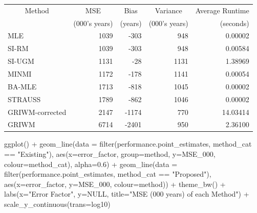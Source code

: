 \documentclass[
]{article}
\newenvironment{Shaded}{\begin{snugshade}}{\end{snugshade}}
\newcommand{\AttributeTok}[1]{\textcolor[rgb]{0.77,0.63,0.00}{#1}}
\newcommand{\ConstantTok}[1]{\textcolor[rgb]{0.00,0.00,0.00}{#1}}
\newcommand{\FloatTok}[1]{\textcolor[rgb]{0.00,0.00,0.81}{#1}}
\newcommand{\FunctionTok}[1]{\textcolor[rgb]{0.00,0.00,0.00}{#1}}
\newcommand{\NormalTok}[1]{#1}
\newcommand{\SpecialCharTok}[1]{\textcolor[rgb]{0.00,0.00,0.00}{#1}}
\newcommand{\StringTok}[1]{\textcolor[rgb]{0.31,0.60,0.02}{#1}}
\begin{document}
\begin{tabular}{lrrrr}
\toprule
\multicolumn{1}{c}{Method} & \multicolumn{1}{c}{MSE} & \multicolumn{1}{c}{Bias} & \multicolumn{1}{c}{Variance} & \multicolumn{1}{c}{Average Runtime} \\
\cmidrule(l{3pt}r{3pt}){1-1} \cmidrule(l{3pt}r{3pt}){2-2} \cmidrule(l{3pt}r{3pt}){3-3} \cmidrule(l{3pt}r{3pt}){4-4} \cmidrule(l{3pt}r{3pt}){5-5}
 & (000's years) & (years) & (000's years) & (seconds)\\
\midrule
MLE & 1039 & -303 & 948 & 0.00002\\
SI-RM & 1039 & -303 & 948 & 0.00584\\
SI-UGM & 1131 & -28 & 1131 & 1.38969\\
MINMI & 1172 & -178 & 1141 & 0.00054\\
BA-MLE & 1713 & -818 & 1045 & 0.00002\\
\addlinespace
STRAUSS & 1789 & -862 & 1046 & 0.00002\\
GRIWM-corrected & 2147 & -1174 & 770 & 14.03414\\
GRIWM & 6714 & -2401 & 950 & 2.36100\\
\bottomrule
\end{tabular}

\begin{Shaded}
\begin{Highlighting}[]
\FunctionTok{ggplot}\NormalTok{() }\SpecialCharTok{+}
  \FunctionTok{geom\_line}\NormalTok{(}\AttributeTok{data =} \FunctionTok{filter}\NormalTok{(performance.point\_estimates, method\_cat }\SpecialCharTok{==} \StringTok{"Existing"}\NormalTok{),}
            \FunctionTok{aes}\NormalTok{(}\AttributeTok{x=}\NormalTok{error\_factor, }\AttributeTok{group=}\NormalTok{method, }\AttributeTok{y=}\NormalTok{MSE\_000, }\AttributeTok{colour=}\NormalTok{method\_cat), }\AttributeTok{alpha=}\FloatTok{0.6}\NormalTok{) }\SpecialCharTok{+}
  \FunctionTok{geom\_line}\NormalTok{(}\AttributeTok{data =} \FunctionTok{filter}\NormalTok{(performance.point\_estimates, method\_cat }\SpecialCharTok{==} \StringTok{"Proposed"}\NormalTok{),}
            \FunctionTok{aes}\NormalTok{(}\AttributeTok{x=}\NormalTok{error\_factor, }\AttributeTok{y=}\NormalTok{MSE\_000, }\AttributeTok{colour=}\NormalTok{method)) }\SpecialCharTok{+}
  \FunctionTok{theme\_bw}\NormalTok{() }\SpecialCharTok{+}
  \FunctionTok{labs}\NormalTok{(}\AttributeTok{x=}\StringTok{"Error Factor"}\NormalTok{, }\AttributeTok{y=}\ConstantTok{NULL}\NormalTok{, }\AttributeTok{title=}\StringTok{"MSE (\textquotesingle{}000 years) of each Method"}\NormalTok{) }\SpecialCharTok{+}
  \FunctionTok{scale\_y\_continuous}\NormalTok{(}\AttributeTok{trans=}\StringTok{\textquotesingle{}log10\textquotesingle{}}\NormalTok{)}
\end{Highlighting}
\end{Shaded}
\end{document}
